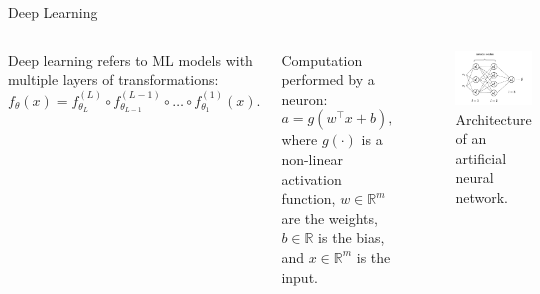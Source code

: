 \documentclass[aspectratio=169,xcolor=dvipsnames]{beamer}
\begin{document}
\begin{frame}{Deep Learning}
    \begin{columns}[c]
        Deep learning refers to ML models with multiple layers of transformations:
        \begin{equation*}
            f_\theta(x) = f^{(L)}_{\theta_L} \circ f^{(L-1)}_{\theta_{L-1}} \circ \dots \circ f^{(1)}_{\theta_1}(x).
        \end{equation*}

        \vspace{1.5em}

        Computation performed by a neuron:
        \begin{equation*}
            a = g(w^\top x + b),
        \end{equation*}
        where $g(\cdot)$ is a non-linear activation function, $w \in \mathbb{R}^m$ are the weights, $b \in \mathbb{R}$ is the bias, and $x \in \mathbb{R}^m$ is the input.


        \begin{figure}
            \centering
            \includegraphics[width=1.\linewidth]{imgs/mlp.pdf}
            \caption{Architecture of an artificial neural network.}
        \end{figure}

    \end{columns}
\end{frame}
\end{document}
